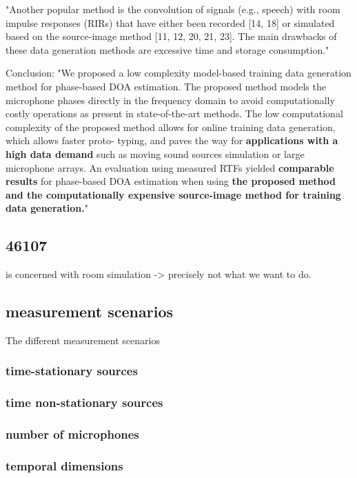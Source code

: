 \documentclass{article}
\begin{document}
"Another popular method is the convolution of signals (e.g., speech) with room impulse responses (RIRs) that have either been recorded [14, 18] or simulated based on the source-image method [11, 12, 20, 21, 23]. The main drawbacks of these data generation methods are excessive time and storage consumption."


Conclusion: 
"We proposed a low complexity model-based training data
generation method for phase-based DOA estimation. The
proposed method models the microphone phases directly
in the frequency domain to avoid computationally costly
operations as present in state-of-the-art methods. The low
computational complexity of the proposed method allows for
online training data generation, which allows faster proto-
typing, and paves the way for \textbf{applications with a high data
demand} such as moving sound sources simulation or large
microphone arrays. An evaluation using measured RTFs
yielded \textbf{comparable results} for phase-based DOA estimation
when using \textbf{the proposed method and the computationally
expensive source-image method for training data generation.}"


\subsection{46107}

\cite{46107} is concerned with room simulation -> precisely not what we want to do. 

\subsection{measurement scenarios}

The different measurement scenarios

\subsubsection{time-stationary sources}

\subsubsection{time non-stationary sources}

\subsubsection{number of microphones}

\subsubsection{temporal dimensions} 
\end{document}
